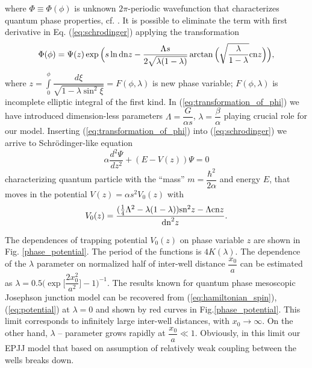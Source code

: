 \documentclass[aps, pre, preprint, groupedaddress, superscriptaddress, showkeys, showpacs] {revtex4-1}
\DeclarePairedDelimiter\ket{\lvert}{\rangle}
\newcommand{\red}{\color{red}}
\begin{document}
%
where $\Phi \equiv \Phi(\phi)$ is unknown $2\pi$-periodic wavefunction that characterizes quantum phase properties, cf. \cite{Anglin}.
%
%
%
%
It is possible to eliminate the term with first derivative in Eq. (\ref{eq:schrodinger}) applying the transformation
%
\begin{equation}
\Phi(\phi) = \Psi(z) \exp \Big( s \ln \textrm{dn}{z} - \dfrac{\Lambda s}{2 \sqrt{\lambda (1 - \lambda)}} \arctan \Big( \sqrt{\dfrac{\lambda}{1 - \lambda}} \textrm{cn}{z} \Big) \Big),
\label{eq:transformation_of_phi}
\end{equation}
%
where $z = \int \limits_0^\phi \dfrac{d \xi}{\sqrt{1 - \lambda \sin^2 \xi}} = F(\phi, \lambda)$ is new phase variable; $F(\phi, \lambda)$ is incomplete elliptic integral of the first kind.
In (\ref{eq:transformation_of_phi}) we have introduced dimension-less parameters $\Lambda = \dfrac{G}{\alpha s}$, $\lambda = \dfrac{\beta}{\alpha}$ playing crucial role for our model.
Inserting (\ref{eq:transformation_of_phi}) into (\ref{eq:schrodinger}) we arrive to Schr\"odinger-like equation
% 
\begin{equation}
\alpha \frac{d^2\Psi}{dz^2} + (E - V(z))\Psi = 0
\label{eq:schrodinger_usual}
\end{equation}
%
characterizing quantum particle with the ``mass''  $m = \dfrac{\hbar^2}{2 \alpha}$ and energy $E$, that moves in the potential $V(z) = \alpha s^2 V_0(z)$ with
%
\begin{equation}
V_0(z) = \frac{ (\frac{1}{4} \Lambda^2 - \lambda (1 - \lambda)) \textrm{sn}^2{z} - \Lambda \textrm{cn}{z}}{\textrm{dn}^2{z}}.
\label{eq:potential}
\end{equation}
%

The dependences of trapping potential $V_0(z)$ on phase variable $z$ are shown in Fig. \ref{phase_potential}. The period of the functions is  $4K(\lambda)$.
The dependence of the $\lambda$ parameter on normalized half of inter-well distance $\dfrac{x_0}{a}$ can be estimated as $\lambda = 0.5 \Big( \exp \Big[ \dfrac{2 x_0^2}{a^2} \Big] - 1 \Big)^{-1}$. The results known for quantum phase mesoscopic Josephson junction model can be recovered from (\ref{eq:hamiltonian_spin}), (\ref{eq:potential}) at $\lambda = 0$ and shown by red curves in  Fig.\ref{phase_potential}. This limit corresponds to  infinitely large inter-well distances, with $x_0 \to \infty$.
On the other hand, $\lambda$ -- parameter grows rapidly at $\dfrac{x_0}{a} \ll 1$.
Obviously, in this limit our EPJJ model that based on assumption of relatively weak coupling between the wells breaks down.
\end{document}
